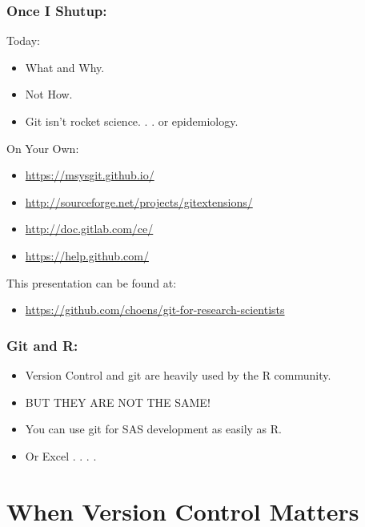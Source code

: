 \documentclass{beamer}
\begin{document}
\begin{frame}
  \frametitle{Once I Shutup:}

  Today:
  \begin{itemize}
  \item What and Why.
  \item Not How.
  \item Git isn't rocket science. . . or epidemiology.
  \end{itemize}

  \bigskip
  On Your Own:
  \begin{itemize}
  \item {\url{https://msysgit.github.io/}}
  \item {\url{http://sourceforge.net/projects/gitextensions/}}
  \item {\url{http://doc.gitlab.com/ce/}}
  \item {\url{https://help.github.com/}}
  \end{itemize}

  \bigskip
  This presentation can be found at:
  \begin{itemize}
  \item {\small{\url{https://github.com/choens/git-for-research-scientists}}}
  \end{itemize}
  
\end{frame}

\begin{frame}
  \frametitle{Git and R:}  

  \begin{itemize}
  \item Version Control and git are heavily used by the R community.
  \item BUT THEY ARE NOT THE SAME!
  \item You can use git for SAS development as easily as R.
  \item Or Excel . . . . 
  \end{itemize}
\end{frame}

\section{When Version Control Matters} %
\end{document}
